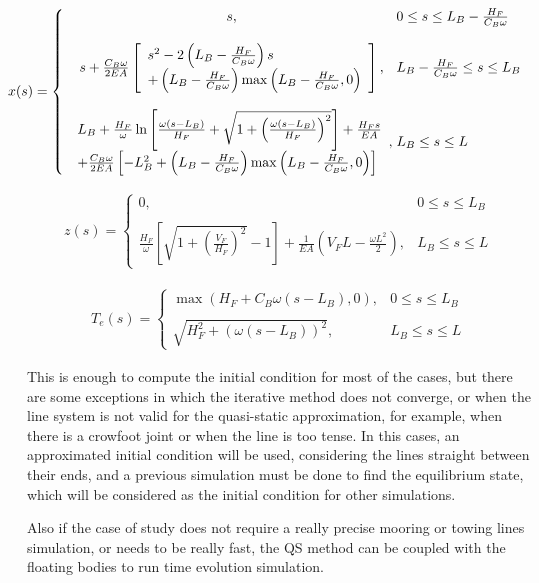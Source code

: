 \documentclass[10pt] {article}
\newcommand{\bean}{\begin{eqnarray}}
\newcommand{\eean}{\end{eqnarray}}
\newcommand{\ba}{\begin{array}}
\newcommand{\ea}{\end{array}}
\newcommand{\om}{\omega}
\begin{document}
\bean
\nonumber
\hspace{-0.5cm} x(s) =  \left\{ \ba{cl} s, & \hspace{-0.25cm} 0 \leq s \leq L_{B} - \frac{H_{F}}{C_{B} \om} \\ & \\
s + \frac{C_{B} \om}{2EA} \left[ \ba{lr} s^{2} - 2 \left(L_{B} - \frac{H_{F}}{C_{B} \om} \right) s \\+\left(L_{B} - \frac{H_{F}}{C_{B} \om}  \right)  \max\left(L_{B} - \frac{H_{F}}{C_{B} \om} ,0\right) \ea \right] 
, & \hspace{-0.25cm} L_{B} - \frac{H_{F}}{C_{B} \om}   \leq s \leq L_{B}\\ & \\
\ba{lr}L_{B} + \frac{H_{F}}{\om} \ln \left[ \frac{\om(s-L_{B})}{H_{F}} + \sqrt{1+\left(\frac{\om(s-L_{B})}{H_{F}} \right)^{2}} \right] + \frac{H_{F}s}{EA} \\
+ \frac{C_{B} \om}{2EA} \left[ -L_{B}^{2} + \left(L_{B} - \frac{H_{F}}{C_{B} \om}  \right)  \max\left(L_{B} - \frac{H_{F}}{C_{B} \om} ,0\right) \right]\ea 
, & \hspace{-0.25cm} L_{B}   \leq s \leq L
\ea \right.
\eean

\bean
\nonumber
z(s) =  \left\{ \ba{cl} 0, & 0 \leq s \leq L_{B} \\ & \\
\frac{H_{F}}{\om} \left[\sqrt{1+\left( \frac{V_{F}}{H_{F}} \right)^{2} } - 1 \right] + \frac{1}{EA} \left( V_{F} L - \frac{\om L^{2}}{2}\right) , & L_{B}  \leq s \leq L \ea \right.
\eean

\bean
\nonumber
T_{e}(s) = \left\{ \ba{cl} \max(H_{F} + C_{B} \om (s - L_{B}),0), & 0 \leq s \leq L_{B} \\ & \\
\sqrt{H_{F}^{2} + (\om (s-L_{B}))^{2}}, & L_{B}  \leq s \leq L \ea \right.
\eean

This is enough to compute the initial condition for most of the cases, but there are some exceptions in which the iterative method does not converge, or when the line system is not valid for the quasi-static approximation, for example, when there is a crowfoot joint or when the line is too tense. In this cases, an approximated initial condition will be used, considering the lines straight between their ends, and a previous simulation must be done to find the equilibrium state, which will be considered as the initial condition for other simulations.

Also if the case of study does not require a really precise mooring or towing lines simulation, or needs to be really fast, the QS method can be coupled with the floating bodies to run time evolution simulation.
\end{document}
